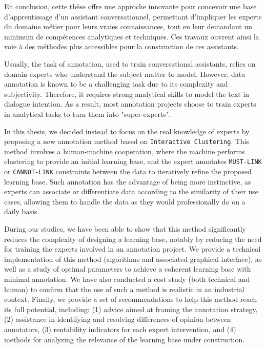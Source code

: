 \begin{ThesisAbstract}
\begin{FrenchAbstract}
		En conclusion, cette thèse offre une approche innovante pour concevoir une base d'apprentissage d'un assistant conversationnel, permettant d'impliquer les experts du domaine métier pour leurs vraies connaissances, tout en leur demandant un minimum de compétences analytiques et techniques.
		Ces travaux ouvrent ainsi la voie à des méthodes plus accessibles pour la construction de ces assistants.
		
	
	\end{FrenchAbstract}
	
	\newpage
	\begin{EnglishAbstract}
		
		Usually, the task of annotation, used to train conversational assistants, relies on domain experts who understand the subject matter to model. However, data annotation is known to be a challenging task due to its complexity and subjectivity.
		Therefore, it requires strong analytical skills to model the text in dialogue intention.
		As a result, most annotation projects choose to train experts in analytical tasks to turn them into "super-experts".
		
		In this thesis, we decided instead to focus on the real knowledge of experts by proposing a new annotation method based on \texttt{Interactive Clustering}.
		This method involves a human-machine cooperation, where the machine performs clustering to provide an initial learning base, and the expert annotates \texttt{MUST-LINK} or \texttt{CANNOT-LINK} constraints between the data to iteratively refine the proposed learning base.
		Such annotation has the advantage of being more instinctive, as experts can associate or differentiate data according to the similarity of their use cases, allowing them to handle the data as they would professionally do on a daily basis.
		
		During our studies, we have been able to show that this method significantly reduces the complexity of designing a learning base, notably by reducing the need for training the experts involved in an annotation project.
		We provide a technical implementation of this method (algorithms and associated graphical interface), as well as a study of optimal parameters to achieve a coherent learning base with minimal annotation.
		We have also conducted a cost study (both technical and human) to confirm that the use of such a method is realistic in an industrial context.
		Finally, we provide a set of recommendations to help this method reach its full potential, including: (1) advice aimed at framing the annotation strategy, (2) assistance in identifying and resolving differences of opinion between annotators, (3) rentability indicators for each expert intervention, and (4) methods for analyzing the relevance of the learning base under construction.
		

\end{EnglishAbstract}
\end{ThesisAbstract}
